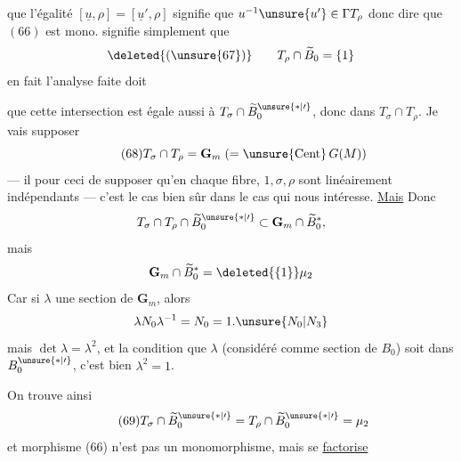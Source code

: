  que l'égalité $[\underline u,\rho]=[\underline u',\rho]$ signifie que $u^{-1}\unsure{u'}\in\Gamma T_\rho$ donc  dire que $(66)$ est mono. signifie simplement que
\[
\deleted{(\unsure{67})}\qquad T_\rho\cap\widetilde B_0=\{1\}
\]
en fait l'analyse faite doit 


que cette intersection est égale aussi à $T_\sigma\cap\widetilde B_0^{\unsure{*|\prime}}$, donc  dans $T_\sigma\cap T_\rho$. Je vais supposer
\[
\tag{68}
T_\sigma\cap T_\rho=\mathbf G_m\;(=\unsure{\mathrm{Cent}}\,G(M))
\]
--- il  pour ceci de supposer qu'en chaque fibre, $1,\sigma,\rho$ sont linéairement indépendants --- c'est le cas bien sûr dans le cas qui nous intéresse. \uline{Mais} Donc
\[
T_\sigma\cap T_\rho\cap\widetilde B_0^{\unsure{*|\prime}}\subset\mathbf G_m\cap\widetilde B_0^*,
\]
mais
\[
\mathbf G_m\cap\widetilde B_0^*=\deleted{\{1\}}\mu_2
\]
Car si $\lambda$   une section  de $\mathbf G_m$, alors
\[
\lambda N_0\lambda^{-1}=N_0=1.\unsure{N_0|N_3}
\]
mais $\det\lambda=\lambda^2$, et la condition que $\lambda$  (considéré comme section de $B_0$) soit dans $B_0^{\unsure{*|\prime}}$, c'est bien \uline{$\lambda^2=1$}. 

On trouve  ainsi
\[
\tag{69}
T_\sigma\cap\widetilde B_0^{\unsure{*|\prime}}=T_\rho\cap\widetilde B_0^{\unsure{*|\prime}}=\mu_2
\]
et  morphisme (66) n'est pas un monomorphisme, mais se \uline{factorise}


